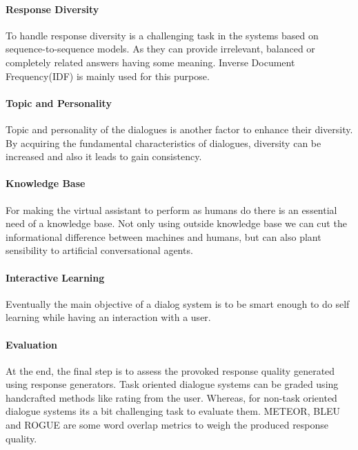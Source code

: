 \paragraph*{Response Diversity}
To handle response diversity is a challenging task in the systems based on sequence-to-sequence models. As they can provide irrelevant, balanced or completely related answers having some meaning. Inverse Document Frequency(IDF) is mainly used for this purpose. \cite{surveyondialogsystems}

\paragraph*{Topic and Personality}
Topic and personality of the dialogues is another factor to enhance their diversity. By acquiring the fundamental characteristics of dialogues, diversity can be increased and also it leads to gain consistency. \cite{surveyondialogsystems} 

\paragraph*{Knowledge Base}
For making the virtual assistant to perform as humans do there is an essential need of a knowledge base. Not only using outside knowledge base we can cut the informational difference between machines and humans, but can also plant sensibility to artificial conversational agents. \cite{surveyondialogsystems} 

\paragraph*{Interactive Learning}
Eventually the main objective of a dialog system is to be smart enough to do self learning while having an interaction with a user.

\paragraph*{Evaluation}
At the end, the final step is to assess the provoked response quality generated using response generators. Task oriented dialogue systems can be graded using handcrafted methods like rating from the user. Whereas, for non-task oriented dialogue systems its a bit challenging task to evaluate them. METEOR, BLEU and ROGUE are some word overlap metrics to weigh the produced response quality. \cite{surveyondialogsystems}    

